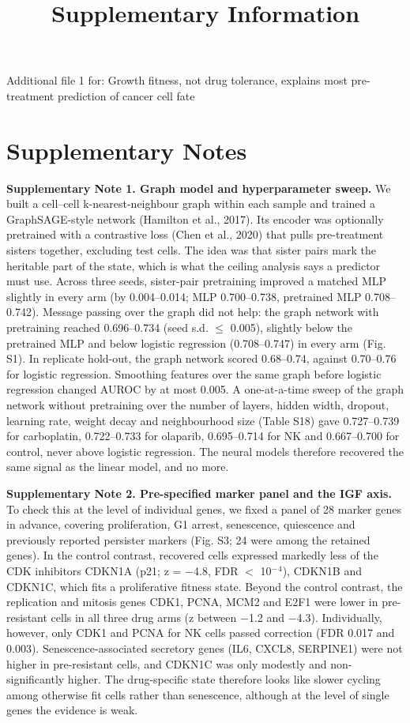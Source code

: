 \documentclass[11pt,a4paper]{article}
\date{}
\begin{document}
\title{Supplementary Information}
\maketitle

Additional file 1 for: Growth fitness, not drug tolerance, explains most pre-treatment prediction of cancer cell fate

\section*{Supplementary Notes}

\textbf{Supplementary Note 1. Graph model and hyperparameter sweep.} We built a cell--cell k-nearest-neighbour graph within each sample and trained a GraphSAGE-style network (Hamilton et al., 2017). Its encoder was optionally pretrained with a contrastive loss (Chen et al., 2020) that pulls pre-treatment sisters together, excluding test cells. The idea was that sister pairs mark the heritable part of the state, which is what the ceiling analysis says a predictor must use. Across three seeds, sister-pair pretraining improved a matched MLP slightly in every arm (by 0.004--0.014; MLP 0.700--0.738, pretrained MLP 0.708--0.742). Message passing over the graph did not help: the graph network with pretraining reached 0.696--0.734 (seed s.d. $\leq$ 0.005), slightly below the pretrained MLP and below logistic regression (0.708--0.747) in every arm (Fig. S1). In replicate hold-out, the graph network scored 0.68--0.74, against 0.70--0.76 for logistic regression. Smoothing features over the same graph before logistic regression changed AUROC by at most 0.005. A one-at-a-time sweep of the graph network without pretraining over the number of layers, hidden width, dropout, learning rate, weight decay and neighbourhood size (Table S18) gave 0.727--0.739 for carboplatin, 0.722--0.733 for olaparib, 0.695--0.714 for NK and 0.667--0.700 for control, never above logistic regression. The neural models therefore recovered the same signal as the linear model, and no more.

\textbf{Supplementary Note 2. Pre-specified marker panel and the IGF axis.} To check this at the level of individual genes, we fixed a panel of 28 marker genes in advance, covering proliferation, G1 arrest, senescence, quiescence and previously reported persister markers (Fig. S3; 24 were among the retained genes). In the control contrast, recovered cells expressed markedly less of the CDK inhibitors CDKN1A (p21; z = $-$4.8, FDR $<$ 10$^-$$^4$), CDKN1B and CDKN1C, which fits a proliferative fitness state. Beyond the control contrast, the replication and mitosis genes CDK1, PCNA, MCM2 and E2F1 were lower in pre-resistant cells in all three drug arms (z between $-$1.2 and $-$4.3). Individually, however, only CDK1 and PCNA for NK cells passed correction (FDR 0.017 and 0.003). Senescence-associated secretory genes (IL6, CXCL8, SERPINE1) were not higher in pre-resistant cells, and CDKN1C was only modestly and non-significantly higher. The drug-specific state therefore looks like slower cycling among otherwise fit cells rather than senescence, although at the level of single genes the evidence is weak.
\end{document}
